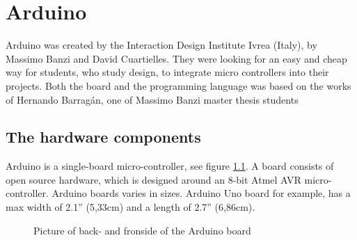 \chapter{Arduino}\label{analysis:arduino}
Arduino was created by the Interaction Design Institute Ivrea (Italy), by Massimo Banzi and David Cuartielles. They were looking for an easy and cheap way for students, who study design, to integrate micro controllers into their projects\cite{arduino:hist}. Both the board and the programming language was based on the works of Hernando Barragán, one of Massimo Banzi master thesis students \cite{Wiring:thesis}

\section{The hardware components}
Arduino is a single-board micro-controller, see figure \ref{fig:Arduino}.
A board consists of open source hardware, which is designed around an 8-bit Atmel AVR micro-controller. Arduino boards varies in sizes. Arduino Uno board for example, has a max width of 2.1'' (5,33cm) and a length of 2.7'' (6,86cm).  \\

\par
{}
\hfill
{}
\begin{figure}[H]
\caption{Picture of back- and fronside of the Arduino board \cite{Arduino_board_pics}}
\label{fig:Arduino}
\end{figure}
\par

